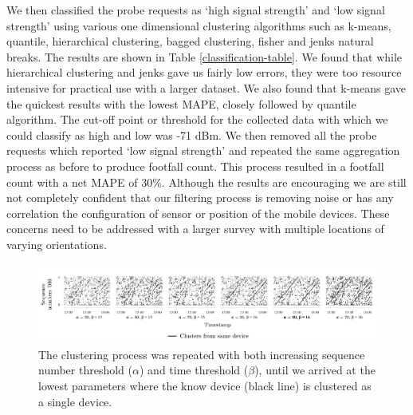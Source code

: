 We then classified the probe requests as `high signal strength' and `low signal
strength' using various one dimensional clustering algorithms such as k-means,
quantile, hierarchical clustering, bagged clustering, fisher and jenks natural
breaks. The results are shown in Table \ref{classification-table}. We found that
while hierarchical clustering and jenks gave us fairly low errors, they were too
resource intensive for practical use with a larger dataset. We also found that
k-means gave the quickest results with the lowest MAPE, closely followed by
quantile algorithm. The cut-off point or threshold for the collected data with
which we could classify as high and low was -71 dBm. We then removed all the
probe requests which reported `low signal strength' and repeated the same
aggregation process as before to produce footfall count. This process resulted
in a footfall count with a net MAPE of 30\%. Although the results are
encouraging we are still not completely confident that our filtering process is
removing noise or has any correlation the configuration of sensor or position of
the mobile devices. These concerns need to be addressed with a larger survey
with multiple locations of varying orientations.

\begin{figure}
   \begin{center}
        \vspace{10pt}
        \includegraphics [width=\linewidth,trim=10 30 10 75,clip]
            {images/pilot_clustering_params.png}
        \caption{The clustering process was repeated with both increasing sequence
            number threshold ($\alpha$) and time threshold ($\beta$), until we
            arrived at the lowest parameters where the know device (black line) is
            clustered as a single device.}
        \label{pilot_clustering_params}
    \end{center}
\end{figure}

